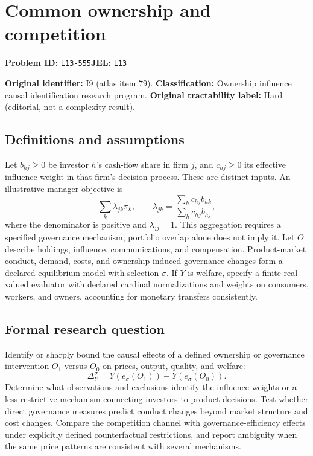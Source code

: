 \documentclass[11pt,a4paper]{article}
\begin{document}
\section*{Common ownership and competition}
\textbf{Problem ID:} \texttt{L13-555}\quad \textbf{JEL:} \texttt{L13}\par
\label{problem:OP-0079}
\label{atlas:prob:I9}

\noindent\textbf{Original identifier:} I9 (atlas item 79). \textbf{Classification:} Ownership influence causal identification research program. \textbf{Original tractability label:} Hard (editorial, not a complexity result).

\subsection*{Definitions and assumptions}

Let $b_{hj}\geq0$ be investor $h$'s cash-flow share in firm $j$, and $c_{hj}\geq0$ its effective influence weight in that firm's decision process. These are distinct inputs. An illustrative manager objective is
\[
\sum_k\lambda_{jk}\pi_k,\qquad
\lambda_{jk}=\frac{\sum_hc_{hj}b_{hk}}{\sum_hc_{hj}b_{hj}},
\]
where the denominator is positive and $\lambda_{jj}=1$. This aggregation requires a specified governance mechanism; portfolio overlap alone does not imply it. Let $O$ describe holdings, influence, communications, and compensation. Product-market conduct, demand, costs, and ownership-induced governance changes form a declared equilibrium model with selection $\sigma$. If $Y$ is welfare, specify a finite real-valued evaluator with declared cardinal normalizations and weights on consumers, workers, and owners, accounting for monetary transfers consistently.

\subsection*{Formal research question}

Identify or sharply bound the causal effects of a defined ownership or governance intervention $O_1$ versus $O_0$ on prices, output, quality, and welfare:
\[
\Delta_Y^\sigma=Y(e_\sigma(O_1))-Y(e_\sigma(O_0)).
\]
Determine what observations and exclusions identify the influence weights or a less restrictive mechanism connecting investors to product decisions. Test whether direct governance measures predict conduct changes beyond market structure and cost changes. Compare the competition channel with governance-efficiency effects under explicitly defined counterfactual restrictions, and report ambiguity when the same price patterns are consistent with several mechanisms.
\end{document}

